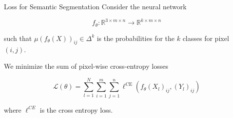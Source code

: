 \begin{frame}[allowframebreaks]

\begin{myconceptblock}{8.24}{Loss for Semantic Segmentation}
    Consider the neural network

    $$
    f_{\theta}: \mathbb{R}^{3 \times m \times n} \rightarrow \mathbb{R}^{k \times m \times n}
    $$

    such that $\mu\left(f_{\theta}(X)\right)_{i j} \in \Delta^{k}$ is the probabilities for the $k$ classes for pixel $(i, j)$.

    We minimize the sum of pixel-wise cross-entropy losses

    $$
    \mathcal{L}(\theta)=\sum_{l=1}^{N} \sum_{i=1}^{m} \sum_{j=1}^{n} \ell^{\mathrm{CE}}\left(f_{\theta}\left(X_{l}\right)_{i j},\left(Y_{l}\right)_{i j}\right)
    $$

    where $\ell^{C E}$ is the cross entropy loss.
\end{myconceptblock}

\end{frame}

